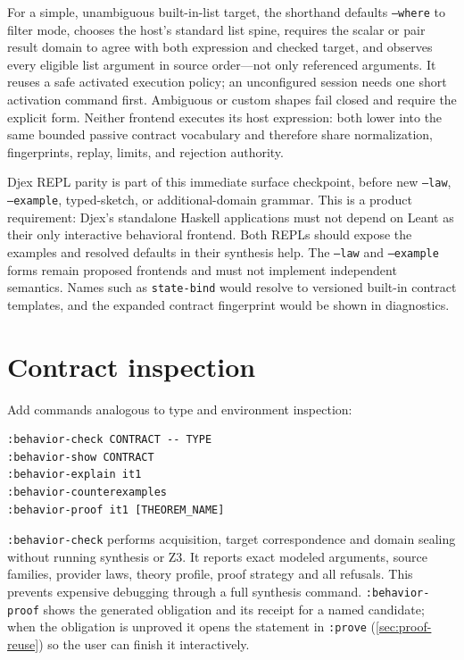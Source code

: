 \documentclass[11pt,oneside]{report}
\newcommand{\code}[1]{\texttt{#1}}
\begin{document}
For a simple, unambiguous built-in-list target, the shorthand defaults
\code{--where} to filter mode, chooses the host's standard list spine,
requires the scalar or pair result domain to agree with both expression and
checked target, and observes every eligible list argument in source order---not
only referenced arguments. It reuses a safe activated execution policy; an
unconfigured session needs one short activation command first. Ambiguous or
custom shapes fail closed and require the explicit form. Neither frontend
executes its host expression: both lower into the same bounded passive contract
vocabulary and therefore share normalization, fingerprints, replay, limits,
and rejection authority.

Djex REPL parity is part of this immediate surface checkpoint, before new
\code{--law}, \code{--example}, typed-sketch, or additional-domain grammar.
This is a product requirement: Djex's standalone Haskell applications must not
depend on Leant as their only interactive behavioral frontend. Both REPLs
should expose the examples and resolved defaults in their synthesis help.
The \code{--law} and \code{--example} forms remain proposed frontends and must
not implement independent semantics. Names such as \code{state-bind} would
resolve to versioned built-in contract templates, and the expanded contract
fingerprint would be shown in diagnostics.

\section{Contract inspection}

Add commands analogous to type and environment inspection:

\begin{lstlisting}[language={}]
:behavior-check CONTRACT -- TYPE
:behavior-show CONTRACT
:behavior-explain it1
:behavior-counterexamples
:behavior-proof it1 [THEOREM_NAME]
\end{lstlisting}

\code{:behavior-check} performs acquisition, target correspondence and domain sealing without running synthesis or Z3. It reports exact modeled arguments, source families, provider laws, theory profile, proof strategy and all refusals. This prevents expensive debugging through a full synthesis command. \code{:behavior-proof} shows the generated obligation and its receipt for a named candidate; when the obligation is unproved it opens the statement in \code{:prove} (\cref{sec:proof-reuse}) so the user can finish it interactively.
\end{document}
